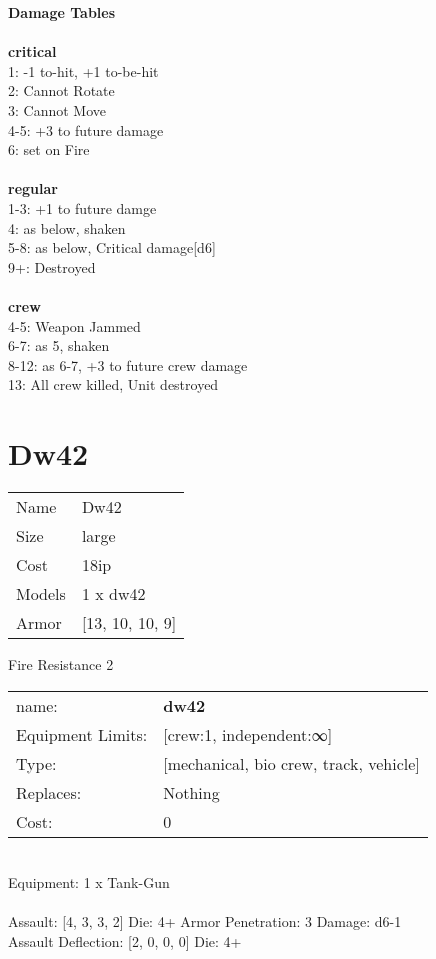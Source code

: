{\bf Damage Tables} \\
\ \\ {\bf critical } \\
1: -1 to-hit, +1 to-be-hit \\
2: Cannot Rotate \\
3: Cannot Move \\
4-5: +3 to future damage \\
6: set on Fire \\
\ \\ {\bf regular } \\
1-3: +1 to future damge \\
4: as below, shaken \\
5-8: as below, Critical damage[d6] \\
9+: Destroyed \\
\ \\ {\bf crew } \\
4-5: Weapon Jammed \\
6-7: as 5, shaken \\
8-12: as 6-7, +3 to future crew damage \\
13: All crew killed, Unit destroyed \\










\pagebreak\pagebreak

\section{ Dw42 }

\begin{tabular}{ll}
  Name & Dw42 \\
  Size & large\\
  Cost & 18ip\\
  Models & 1 x dw42\\
  Armor & [13, 10, 10, 9]\\
\end{tabular}

\noindent Fire Resistance 2\\ 


\noindent
\begin{tabular}{ll}
name: &{\bf dw42 } \\
Equipment Limits: &[crew:1, independent:∞] \\
Type: &[mechanical, bio crew, track, vehicle] \\
Replaces: &Nothing \\
Cost: & 0\\
\end{tabular}
\ \\
Equipment: 1 x Tank-Gun \\
\ \\
Assault: [4, 3, 3, 2] Die: 4+ Armor Penetration: 3 Damage: d6-1 \\
Assault Deflection: [2, 0, 0, 0] Die: 4+\\
\indent  
\ \\

